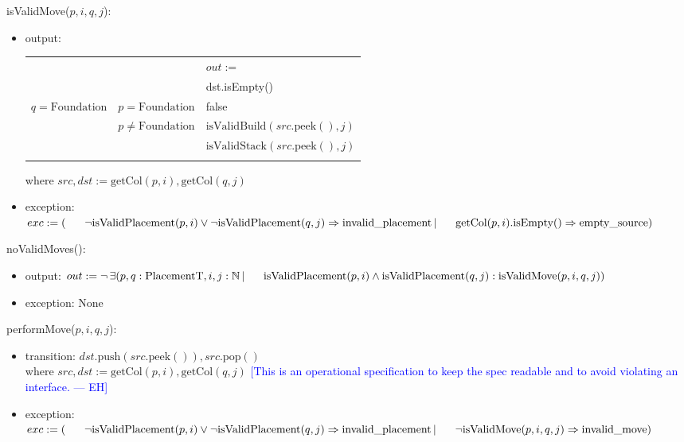 \documentclass[12pt]{article}
\newcommand{\ind}{\hspace*{0.6cm}}
\newcommand{\Implies}{\Rightarrow}
\newcommand{\rem}[1]{\textcolor{blue}{[#1 --- EH]}}
\begin{document}
\noindent isValidMove($p, i, q, j$):
\begin{itemize}
    \item output:

        \begin{tabular}[t]{|l|l|l|}
            \hhline{~|~|-|}
            \multicolumn{1}{r}{} & \multicolumn{1}{r|}{} & $out :=$\\
            \hhline{|-|-|-|}
            \multicolumn{1}{|l}{$q = \mbox{Cell}$} & ~ & dst.\mbox{isEmpty}()\\
            \hhline{|-|-|-|}
            $q = \mbox{Foundation}$ & $p = \mbox{Foundation}$ & false\\
            \hhline{|~|-|-|}
            ~ & $p \neq \mbox{Foundation}$ & $\mbox{isValidBuild}(src.\mbox{peek}(), j)$\\
            \hhline{|-|-|-|}
            \multicolumn{1}{|l}{$q = \mbox{Cascade}$} & ~ & $\mbox{isValidStack}(src.\mbox{peek}(), j)$\\
            \hhline{|-|-|-|}
        \end{tabular}

        where $src, dst := \mbox{getCol}(p, i), \mbox{getCol}(q, j)$
    \item exception: $exc := (\\\ind
        \lnot \mbox{isValidPlacement}(p, i) \lor
        \lnot \mbox{isValidPlacement}(q, j) \Implies \mbox{invalid\_placement} \,|\,\\
        \ind\mbox{getCol}(p, i).\mbox{isEmpty}() \Implies \mbox{empty\_source}\\)$
\end{itemize}

\noindent noValidMoves():
\begin{itemize}
    \item output: $out := \lnot \,\exists( p, q : \mbox{PlacementT}, i, j : \mathbb{N} \,|\,\\\ind
        \mbox{isValidPlacement}(p, i) \land \mbox{isValidPlacement}(q, j) :
        \mbox{isValidMove}(p, i, q, j))$
    \item exception: None
\end{itemize}

\noindent performMove($p, i, q, j$):
\begin{itemize}
    \item transition: $dst.\mbox{push}(src.\mbox{peek}()), src.\mbox{pop}()$\\\ind
        where $src, dst := \mbox{getCol}(p, i), \mbox{getCol}(q, j)$
        \rem{This is an operational specification to keep the spec readable
        and to avoid violating an interface.}
    \item exception: $exc := (\\\ind
        \lnot \mbox{isValidPlacement}(p, i) \lor
        \lnot \mbox{isValidPlacement}(q, j) \Implies \mbox{invalid\_placement} \,|\,\\\ind
        \lnot \mbox{isValidMove}(p, i, q, j) \Implies \mbox{invalid\_move}\\)$
\end{itemize}
\end{document}
